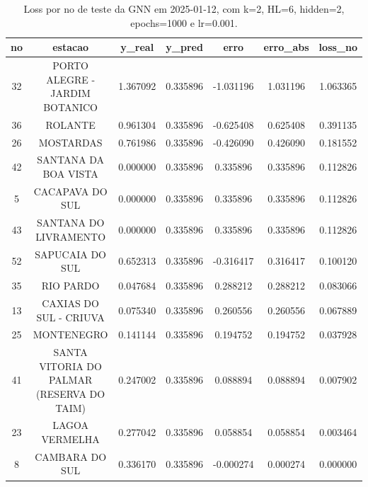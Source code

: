 \begin{table}[h]
\centering
\caption{Loss por no de teste da GNN em 2025-01-12, com k=2, HL=6, hidden=2, epochs=1000 e lr=0.001.}
\label{tab:gnn_loss_k2_hl6_h2_e1000_d20250112}
\begin{tabular}{ccccccc}
\toprule
no & estacao & y\_real & y\_pred & erro & erro\_abs & loss\_no \\
\midrule
32 & PORTO ALEGRE - JARDIM BOTANICO & 1.367092 & 0.335896 & -1.031196 & 1.031196 & 1.063365 \\
36 & ROLANTE & 0.961304 & 0.335896 & -0.625408 & 0.625408 & 0.391135 \\
26 & MOSTARDAS & 0.761986 & 0.335896 & -0.426090 & 0.426090 & 0.181552 \\
42 & SANTANA DA BOA VISTA & 0.000000 & 0.335896 & 0.335896 & 0.335896 & 0.112826 \\
5 & CACAPAVA DO SUL & 0.000000 & 0.335896 & 0.335896 & 0.335896 & 0.112826 \\
43 & SANTANA DO LIVRAMENTO & 0.000000 & 0.335896 & 0.335896 & 0.335896 & 0.112826 \\
52 & SAPUCAIA DO SUL & 0.652313 & 0.335896 & -0.316417 & 0.316417 & 0.100120 \\
35 & RIO PARDO & 0.047684 & 0.335896 & 0.288212 & 0.288212 & 0.083066 \\
13 & CAXIAS DO SUL - CRIUVA & 0.075340 & 0.335896 & 0.260556 & 0.260556 & 0.067889 \\
25 & MONTENEGRO & 0.141144 & 0.335896 & 0.194752 & 0.194752 & 0.037928 \\
41 & SANTA VITORIA DO PALMAR (RESERVA DO TAIM) & 0.247002 & 0.335896 & 0.088894 & 0.088894 & 0.007902 \\
23 & LAGOA VERMELHA & 0.277042 & 0.335896 & 0.058854 & 0.058854 & 0.003464 \\
8 & CAMBARA DO SUL & 0.336170 & 0.335896 & -0.000274 & 0.000274 & 0.000000 \\
\bottomrule
\end{tabular}
\end{table}

